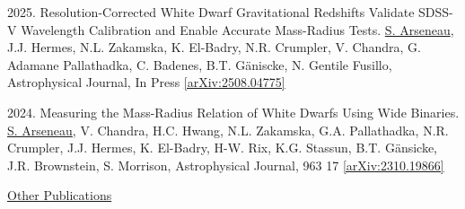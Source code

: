 \documentclass[letterpaper,11pt]{article}
\newenvironment{packed_enumerate}[1][]{
\begin{etaremune}[#1]
  \setlength{\itemsep}{3.7pt}
  \setlength{\parskip}{0pt}
  \setlength{\parsep}{0pt}}{\end{etaremune}
}
\begin{document}
\begin{packed_enumerate}

\item 2025. Resolution-Corrected White Dwarf Gravitational Redshifts Validate SDSS-V Wavelength Calibration and Enable Accurate Mass-Radius Tests. \underline{S. Arseneau}, J.J. Hermes, N.L. Zakamska, K. El-Badry, N.R. Crumpler, V. Chandra, G. Adamane Pallathadka, C. Badenes, B.T. G\"aniscke, N. Gentile Fusillo, Astrophysical Journal, In Press \href{https://arxiv.org/abs/2508.04775}{[arXiv:2508.04775]}

\item 2024. Measuring the Mass-Radius Relation of White Dwarfs Using Wide Binaries. \underline{S. Arseneau}, V. Chandra, H.C. Hwang, N.L. Zakamska, G.A. Pallathadka, N.R. Crumpler, J.J. Hermes, K. El-Badry, H-W. Rix, K.G. Stassun, B.T. G\"ansicke, J.R. Brownstein, S. Morrison, Astrophysical Journal, 963 17 \href{https://arxiv.org/abs/2310.19866}{[arXiv:2310.19866]}

\end{packed_enumerate}

\noindent
\underline{Other Publications}
\noindent
\end{document}
